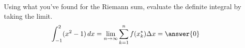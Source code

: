 \documentclass{ximera}
\begin{document}
\begin{exercise}
\begin{exercise}
\begin{exercise}
\begin{exercise}
				\begin{exercise}
					Using what you've found for the Riemann sum, evaluate the definite integral by taking the limit.
					\[ \int_{-1}^{2} (x^2-1) \d x = \lim_{n\to\infty} \sum_{k=1}^{n} f(x_k^*)\Delta x = \answer{0} \]
				\end{exercise}
			\end{exercise}
		\end{exercise}
	\end{exercise}
\end{exercise}
\end{document}
